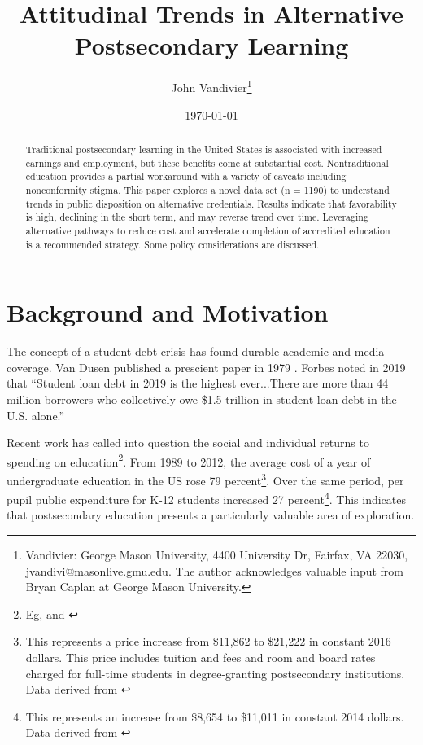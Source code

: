 \documentclass[AER]{./aea-latex-templates/AEA}
\begin{document}
\title{Attitudinal Trends in Alternative Postsecondary Learning}
\author{John Vandivier\thanks{Vandivier: George Mason University, 4400 University Dr, Fairfax, VA 22030, jvandivi@masonlive.gmu.edu. The author acknowledges valuable input from Bryan Caplan at George Mason University.}}
\date{\today}

\begin{abstract}
Traditional postsecondary learning in the United States is associated
with increased earnings and employment, but these benefits come at
substantial cost. Nontraditional education provides a partial workaround
with a variety of caveats including nonconformity stigma. This paper
explores a novel data set (n = 1190) to understand trends in public
disposition on alternative credentials. Results indicate that
favorability is high, declining in the short term, and may reverse trend
over time. Leveraging alternative pathways to reduce cost and accelerate
completion of accredited education is a recommended strategy. Some
policy considerations are discussed.
\end{abstract}

\maketitle

\section{Background and Motivation}

The concept of a student debt crisis has found durable academic and media
coverage. Van Dusen published a prescient paper in 1979 \cite{van1979coming}. Forbes noted in 2019\cite{friedman2018student} that “Student loan
debt in 2019 is the highest ever...There are more than 44 million borrowers
who collectively owe \$1.5 trillion in student loan debt in the U.S.
alone.”

Recent work has called into question the social and individual returns to spending on
education\footnote{Eg, \cite{caplan2018case} and \cite{craig_2018}}. From 1989 to 2012, the average cost of a year of undergraduate education
in the US rose 79 percent\footnote{This represents a price increase from \$11,862 to \$21,222 in constant 2016
dollars. This price includes tuition and fees and room and board rates charged for full-time students in
degree-granting postsecondary institutions. Data derived from \cite{nces2017averageundergraduatetuition}}.
Over the same period, per pupil public expenditure for
K-12 students increased 27 percent\footnote{This represents an increase from \$8,654 to \$11,011 in constant
2014 dollars. Data derived from \cite{nces2015expendituresperpupil}}. This indicates that
postsecondary education presents a particularly valuable area of exploration.
\end{document}
